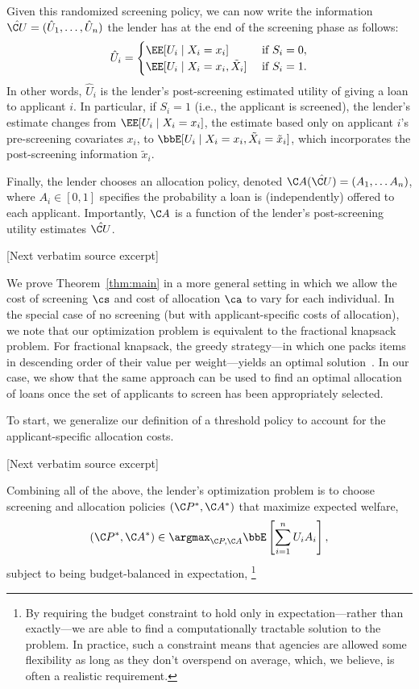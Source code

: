 \documentclass[10pt]{article}
\begin{document}
\begin{ReviewVerbatim}
Given this randomized screening policy, we can now write the information \(\hat {\C U} = (\hat U_1, \ldots, \hat U_n)\) the lender has at the end of the screening phase as follows:
    \begin{equation}
        \hat U_i = \begin{cases}
            \EE[U_i \mid X_i = x_i] & \text{ if } S_i = 0, \\
            \EE[U_i \mid X_i = x_i, \tilde{X}_i] & \text{ if } S_i =1.
        \end{cases}
    \end{equation}
In other words, \(\hat U_i\) is the lender's post-screening estimated utility of giving a loan to applicant \(i\).
In particular, if \(S_i = 1\) (i.e., the applicant is screened), the lender's estimate changes from \(\EE[U_i\mid X_i = x_i]\),
the estimate based only on applicant \(i\)'s pre-screening covariates \(x_i\),
to
\(\bbE[U_i \mid X_i = x_i, \tilde{X}_i = \tilde{x}_i] \), which incorporates the post-screening information \(\tilde{x}_i\).

Finally, the lender chooses an allocation policy, denoted \(\C A(\hat {\C U}) = (A_1, \dots A_n)\),
where \(A_i \in [0,1]\)
specifies the probability a loan is (independently) offered to each applicant.
Importantly, \(\C A\) is a function of
the lender's post-screening utility estimates
\(\hat {\C U}\).

[Next verbatim source excerpt]

We prove Theorem~\ref{thm:main} in a more general setting in which we allow the cost of screening \(\cs\) and cost of allocation \(\ca\) to vary for each individual.
In the special case of no screening (but with applicant-specific costs of allocation), we note that our optimization problem is equivalent to the fractional knapsack problem.
For fractional knapsack, the greedy strategy---in which one packs items in descending order of their value per weight---yields an optimal solution~\cite{dantzig1957discrete}.
In our case, we show that the same approach can be used to find an optimal allocation of loans once the set of applicants to screen has been appropriately selected.

To start, we generalize our definition of a threshold policy to account for the applicant-specific allocation costs.

[Next verbatim source excerpt]

Combining all of the above, the lender's optimization problem is to choose screening and allocation policies \((\C P^*, \C A^*)\) that maximize expected welfare,
\begin{equation}
\label{eq:def1}
    (\C P^*, \C A^*) \in \argmax_{\C P, \C A} \bbE\left[\sum_{i = 1}^n U_i A_i\right],
\end{equation}
subject to being budget-balanced in expectation,%
\footnote{By requiring the budget constraint to hold only in expectation---rather than exactly---we are able to find a computationally tractable solution to the problem. In practice, such a constraint means that agencies are allowed some flexibility as long as they don't overspend on average,
which, we believe, is often a realistic requirement.
}


\end{ReviewVerbatim}
\end{document}
